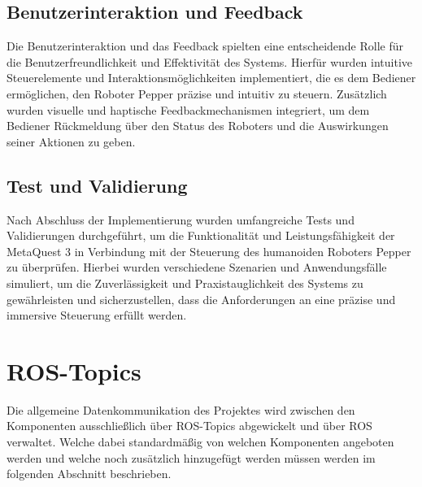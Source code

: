\subsection{Benutzerinteraktion und Feedback}
Die Benutzerinteraktion und das Feedback spielten eine entscheidende Rolle für die Benutzerfreundlichkeit und Effektivität des Systems. Hierfür wurden intuitive Steuerelemente und Interaktionsmöglichkeiten implementiert, die es dem Bediener ermöglichen, den Roboter Pepper präzise und intuitiv zu steuern. Zusätzlich wurden visuelle und haptische Feedbackmechanismen integriert, um dem Bediener Rückmeldung über den Status des Roboters und die Auswirkungen seiner Aktionen zu geben.

\subsection{Test und Validierung}
Nach Abschluss der Implementierung wurden umfangreiche Tests und Validierungen durchgeführt, um die Funktionalität und Leistungsfähigkeit der MetaQuest 3 in Verbindung mit der Steuerung des humanoiden Roboters Pepper zu überprüfen. Hierbei wurden verschiedene Szenarien und Anwendungsfälle simuliert, um die Zuverlässigkeit und Praxistauglichkeit des Systems zu gewährleisten und sicherzustellen, dass die Anforderungen an eine präzise und immersive Steuerung erfüllt werden.

\section{ROS-Topics}\label{sec:ros-topics}
Die allgemeine Datenkommunikation des Projektes wird zwischen den Komponenten ausschließlich über \ac{ROS}-Topics abgewickelt und über \ac{ROS} verwaltet. Welche dabei standardmäßig von welchen Komponenten angeboten werden und welche noch zusätzlich hinzugefügt werden müssen werden im folgenden Abschnitt beschrieben.\\
